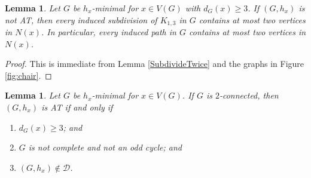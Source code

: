 \documentclass[12pt]{article}
\theoremstyle{plain}
\newtheorem{lem}[thm]{Lemma}
\theoremstyle{definition}
\theoremstyle{remark}
\newcommand{\fancy}[1]{\mathcal{#1}}
\newcommand{\D}{\fancy{D}}
\def\D{\fancy{D}}
\begin{document}
\begin{lem}\label{NoClawBusiness}
	Let $G$ be $h_x$-minimal for $x \in V(G)$ with $d_G(x) \ge 3$.  If $(G,h_x)$ is not AT, then every induced subdivision of $K_{1,3}$ in $G$ contains at most two vertices in $N(x)$.  In particular, every induced path in $G$ contains at most two vertices in $N(x)$.
\end{lem}
\begin{proof}
	This is immediate from Lemma \ref{SubdivideTwice} and the graphs in Figure \ref{fig:chair}.
\end{proof}

\begin{lem}
	Let $G$ be $h_x$-minimal for $x \in V(G)$.  If $G$ is $2$-connected, then $(G,h_x)$ is AT if and only if 
	\begin{enumerate}
		\item $d_G(x) \ge 3$; and
		\item $G$ is not complete and not an odd cycle; and
		\item $(G,h_x) \not \in \D$.
	\end{enumerate}
\end{lem}
\end{document}
